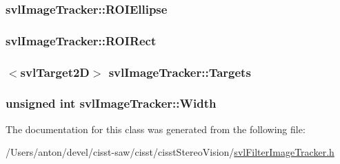 \subsubsection[{R\+O\+I\+Ellipse}]{ svl\+Image\+Tracker\+::\+R\+O\+I\+Ellipse\hspace{0.3cm}{\ttfamily [protected]}}\label{classsvl_image_tracker_aedd5673ace2aef2c64c0e0b5a52f7e14}
\hypertarget{classsvl_image_tracker_a89ce7f905564fec40407e77aa898e465}{}
\subsubsection[{R\+O\+I\+Rect}]{ svl\+Image\+Tracker\+::\+R\+O\+I\+Rect\hspace{0.3cm}{\ttfamily [protected]}}\label{classsvl_image_tracker_a89ce7f905564fec40407e77aa898e465}
\hypertarget{classsvl_image_tracker_acc589d98d13de77df8a2eed855df9d28}{}
\subsubsection[{Targets}]{$<${\bf svl\+Target2\+D}$>$ svl\+Image\+Tracker\+::\+Targets\hspace{0.3cm}{\ttfamily [protected]}}\label{classsvl_image_tracker_acc589d98d13de77df8a2eed855df9d28}
\hypertarget{classsvl_image_tracker_a6bad5bd6edbd63f8a350203afe26dea6}{}
\subsubsection[{Width}]{\setlength{\rightskip}{0pt plus 5cm}unsigned int svl\+Image\+Tracker\+::\+Width\hspace{0.3cm}{\ttfamily [protected]}}\label{classsvl_image_tracker_a6bad5bd6edbd63f8a350203afe26dea6}


The documentation for this class was generated from the following file\+:\begin{DoxyCompactItemize}
\item 
/\+Users/anton/devel/cisst-\/saw/cisst/cisst\+Stereo\+Vision/\hyperlink{svl_filter_image_tracker_8h}{svl\+Filter\+Image\+Tracker.\+h}\end{DoxyCompactItemize}
